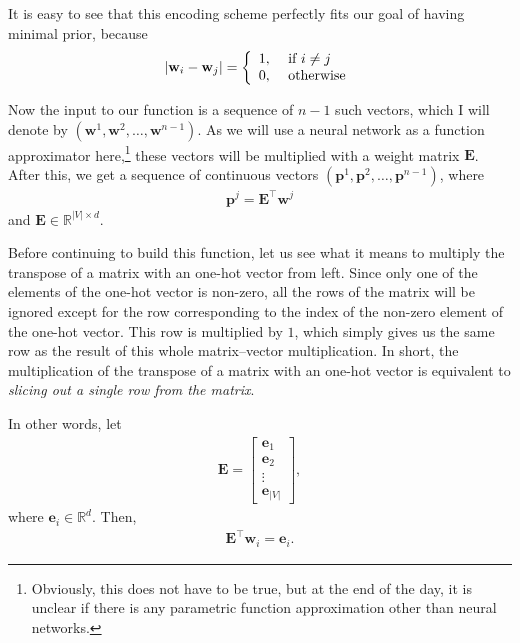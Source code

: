 \documentclass{report}
\newcommand{\vect}[1]{\mathbf{#1}}
\newcommand{\matr}[1]{\mathbf{#1}}
\newcommand{\ve}[0]{\vect{e}}
\newcommand{\vp}[0]{\vect{p}}
\newcommand{\vw}[0]{\vect{w}}
\newcommand{\mE}[0]{\matr{E}}
\newcommand{\RR}[0]{\mathbb{R}}
\begin{document}
It is easy to see that this encoding scheme perfectly fits our goal of having
minimal prior, because
\begin{align*}
    |\vw_i - \vw_j| = \left\{
        \begin{array}{l l}
            1,&\text{ if }i\neq j \\
            0,&\text{ otherwise}
        \end{array}
        \right.
\end{align*}

Now the input to our function is a sequence of $n-1$ such vectors, which I will
denote by $(\vw^1, \vw^2, \ldots, \vw^{n-1})$. As we will use a neural network
as a function approximator here,\footnote{
    Obviously, this does not have to be true, but at the end of the day, it is
    unclear if there is any parametric function approximation other than neural
    networks.
} 
these vectors will be multiplied with a weight matrix $\mE$. After this, we get
a sequence of continuous vectors $(\vp^1, \vp^2, \ldots, \vp^{n-1})$, where
\begin{align*}
    \vp^j = \mE^\top \vw^j
\end{align*}
and $\mE \in \RR^{|V| \times d}$. 

Before continuing to build this function, let us see what it means to multiply
the transpose of a matrix with an one-hot vector from left. Since only one of
the elements of the one-hot vector is non-zero, all the rows of the matrix will
be ignored except for the row corresponding to the index of the non-zero element
of the one-hot vector. This row is multiplied by $1$, which simply gives us the
same row as the result of this whole matrix--vector multiplication. In short,
the multiplication of the transpose of a matrix with an one-hot vector is
equivalent to {\em slicing out a single row from the matrix}.

In other words, let 
\begin{align}
    \label{eq:word_emb}
    \mE = \left[ 
        \begin{array}{l}
            \ve_1 \\
            \ve_2 \\
            \vdots \\
            \ve_{|V|}
        \end{array}
    \right],
\end{align}
where $\ve_i \in \RR^d$. Then,
\begin{align*}
    \mE^\top \vw_i = \ve_i.
\end{align*}
\end{document}
